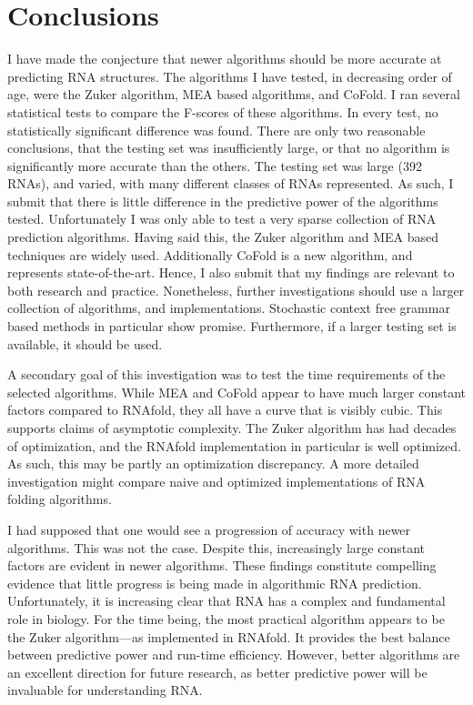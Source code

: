 \documentclass[12pt, a4paper]{article}
\begin{document}
\section{Conclusions}
I have made the conjecture that newer algorithms should be more accurate at predicting RNA structures. The algorithms I have tested, in decreasing order of age, were the Zuker algorithm, MEA based algorithms, and CoFold. I ran several statistical tests to compare the F-scores of these algorithms. In every test, no statistically significant difference was found. There are only two reasonable conclusions, that the testing set was insufficiently large, or that no algorithm is significantly more accurate than the others. The testing set was large (392 RNAs), and varied, with many different classes of RNAs represented. As such, I submit that there is little difference in the predictive power of the algorithms tested. Unfortunately I was only able to test a very sparse collection of RNA prediction algorithms. Having said this, the Zuker algorithm and MEA based techniques are widely used. Additionally CoFold is a new algorithm, and represents state-of-the-art. Hence, I also submit that my findings are relevant to both research and practice. Nonetheless, further investigations should use a larger collection of algorithms, and implementations. Stochastic context free grammar based methods in particular show promise. Furthermore, if a larger testing set is available, it should be used.

A secondary goal of this investigation was to test the time requirements of the selected algorithms. While MEA and CoFold appear to have much larger constant factors compared to RNAfold, they all have a curve that is visibly cubic. This supports claims of asymptotic complexity. The Zuker algorithm has had decades of optimization, and the RNAfold implementation in particular is well optimized. As such, this may be partly an optimization discrepancy. A more detailed investigation might compare naive and optimized implementations of RNA folding algorithms.

I had supposed that one would see a progression of accuracy with newer algorithms. This was not the case. Despite this, increasingly large constant factors are evident in newer algorithms. These findings constitute compelling evidence that little progress is being made in algorithmic RNA prediction. Unfortunately, it is increasing clear that RNA has a complex and fundamental role in biology. For the time being, the most practical algorithm appears to be the Zuker algorithm---as implemented in RNAfold. It provides the best balance between predictive power and run-time efficiency. However, better algorithms are an excellent direction for future research, as better predictive power will be invaluable for understanding RNA.





\end{document}
